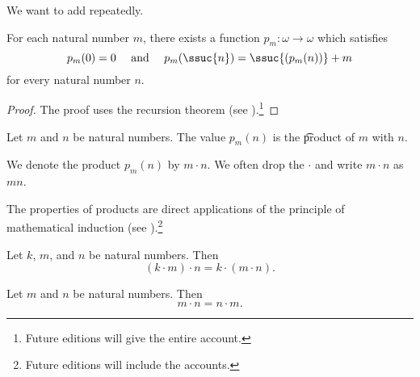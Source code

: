 

We want to add repeatedly.



\begin{proposition}
	For each natural number $m$, there exists a function $p_m: \omega \to \omega$ which satisfies
	\[
		p_m(0) = 0 \quad \text{ and } \quad p_m(\ssuc{n}) = \ssuc{(p_m(n))} + m
	\]
	for every natural number $n$.
\end{proposition}
\begin{proof}
	The proof uses the recursion theorem (see ).\footnote{Future editions will give the entire account.}
\end{proof}
Let $m$ and $n$ be natural numbers.
The value $p_m(n)$ is the \t{product} of $m$ with $n$.



We denote the product $p_m(n)$ by $m \cdot n$.
We often drop the $\cdot$ and write $m \cdot n$ as $mn$.



The properties of products are direct applications of the principle of mathematical induction (see ).\footnote{Future editions will include the accounts.}

\begin{proposition}[Associativity]
	Let $k$, $m$, and $n$ be natural numbers. Then
	\[
		(k \cdot m) \cdot n = k \cdot (m \cdot n).
	\]
\end{proposition}

\begin{proposition}
	Let $m$ and $n$ be natural numbers. Then
	\[
		m \cdot n = n \cdot m.
	\]
\end{proposition}




